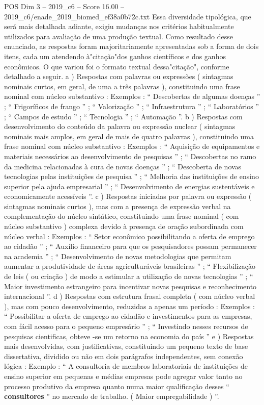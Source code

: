 \begin{textsample}{POS Dim 3 – 2019\_c6 – Score 16.00 – 2019\_c6/enade\_2019\_biomed\_ef38a0b72c.txt}
Essa diversidade tipológica, que será mais detalhada adiante, exigiu mudanças nos critérios habitualmente utilizados para avaliação de uma produção textual.
Como resultado desse enunciado, as respostas foram majoritariamente apresentadas sob a forma de dois itens, cada um atendendo à"citação"dos ganhos científicos e dos ganhos econômicos.
O que variou foi o formato textual dessa"citação", conforme detalhado a seguir. a ) Respostas com palavras ou expressões ( sintagmas nominais curtos, em geral, de uma a três palavras ), constituindo uma frase nominal com núcleo substantivo : Exemplos : “ Descobertas de algumas doenças ” ; “ Frigoríficos de frango ” ; “ Valorização ” ; “ Infraestrutura ” ; “ Laboratórios ” ; “ Campos de estudo ” ; “ Tecnologia ” ; “ Automação ”. b ) Respostas com desenvolvimento do conteúdo da palavra ou expressão nuclear ( sintagmas nominais mais amplos, em geral de mais de quatro palavras ), constituindo uma frase nominal com núcleo substantivo : Exemplos : “ Aquisição de equipamentos e materiais necessários ao desenvolvimento de pesquisas ” ; “ Descobertas no ramo da medicina relacionadas à cura de novas doenças ” ; “ Descoberta de novas tecnologias pelas instituições de pesquisa ” ; “ Melhoria das instituições de ensino superior pela ajuda empresarial ” ; “ Desenvolvimento de energias sustentáveis e economicamente acessíveis ”. c ) Respostas iniciadas por palavra ou expressão ( sintagmas nominais curtos ), mas com a presença de expressão verbal na complementação do núcleo sintático, constituindo uma frase nominal ( com núcleo substantivo ) complexa devido à presença de oração subordinada com núcleo verbal : Exemplos : “ Setor econômico possibilitando a oferta de emprego ao cidadão ” ; “ Auxílio financeiro para que os pesquisadores possam permanecer na academia ” ; “ Desenvolvimento de novas metodologias que permitam aumentar a produtividade de áreas agriculturáveis brasileiras ” ; “ Flexibilização de leis ( ou criação ) de modo a estimular a utilização de novas tecnologias ” ; “ Maior investimento estrangeiro para incentivar novas pesquisas e reconhecimento internacional ”. d ) Respostas com estrutura frasal completa ( com núcleo verbal ), mas com pouco desenvolvimento, reduzidas a apenas um período : Exemplos : “ Possibilitar a oferta de emprego ao cidadão e investimentos para as empresas, com fácil acesso para o pequeno empresário ” ; “ Investindo nesses recursos de pesquisas cientificas, obteve -se um retorno na economia do país ” e ) Respostas mais desenvolvidas, com justificativas, constituindo um pequeno texto de base dissertativa, dividido ou não em dois parágrafos independentes, sem conexão lógica : Exemplo : “ A consultoria de membros laboratoriais de instituições de ensino superior em pequenas e médias empresas pode agregar valor tanto no processo produtivo da empresa quanto numa maior qualificação desses “ \textbf{consultores} ” no mercado de trabalho. ( Maior empregabilidade ) ”.

\end{textsample}
